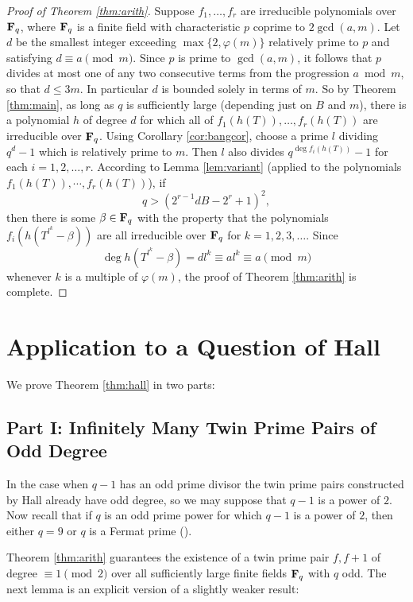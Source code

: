 \documentclass[a4paper]{compositio}
\begin{document}
\begin{proof}[Proof of Theorem \ref{thm:arith}] Suppose $f_1, \dots,
f_r$ are irreducible polynomials over $\mathbf{F}_q$, where $\mathbf{F}_q$ is a
finite field with characteristic $p$ coprime to $2\gcd(a,m)$. Let
$d$ be the smallest integer exceeding $\max\{2, \varphi(m)\}$
relatively prime to $p$ and satisfying $d\equiv a \pmod{m}$. Since
$p$ is prime to $\gcd(a,m)$, it follows that $p$ divides at most one
of any two consecutive terms from the progression $a\bmod{m}$, so
that $d \leq 3m$. In particular $d$ is bounded solely in terms of
$m$. So by Theorem \ref{thm:main}, as long as $q$ is sufficiently
large (depending just on $B$ and $m$), there is a polynomial $h$ of
degree $d$ for which all of $f_1(h(T)), \dots, f_r(h(T))$ are
irreducible over $\mathbf{F}_q$. Using Corollary \ref{cor:bangcor}, choose a
prime $l$ dividing $q^d-1$ which is relatively prime to $m$. Then
$l$ also divides $q^{\deg{f_i(h(T))}}-1$ for each $i=1,2,\dots,r$.
According to Lemma \ref{lem:variant} (applied to the polynomials
$f_1(h(T)), \cdots, f_r(h(T))$), if
\[ q> (2^{r-1}dB - 2^r + 1)^2, \] then there is some $\beta \in
\mathbf{F}_q$ with the property that the polynomials $f_i(h(T^{l^k}-\beta))$
are all irreducible over $\mathbf{F}_q$ for $k=1, 2, 3, \dots$. Since
\[ \deg{h(T^{l^k}-\beta)} = d l^k \equiv a l^k \equiv a
\pmod{m} \] whenever $k$ is a multiple of $\varphi(m)$, the proof of
Theorem \ref{thm:arith} is complete.\end{proof}


\section{Application to a Question of Hall}
We prove Theorem \ref{thm:hall} in two parts:
\subsection{Part I: Infinitely Many Twin Prime Pairs of Odd Degree}
In the case when $q-1$ has an odd prime divisor the twin prime pairs
constructed by Hall \cite{hall06} already have odd degree, so we may
suppose that $q-1$ is a power of $2$. Now recall that if $q$ is an
odd prime power for which $q-1$ is a power of $2$, then either $q=9$
or $q$ is a Fermat prime (\cite[p. 374, Exercise 1]{sierpinski88}).

Theorem \ref{thm:arith} guarantees the existence of a twin prime
pair $f, f+1$ of degree $\equiv 1 \pmod{2}$ over all sufficiently
large finite fields $\mathbf{F}_q$ with $q$ odd. The next lemma is an
explicit version of a slightly weaker result:
\end{document}
